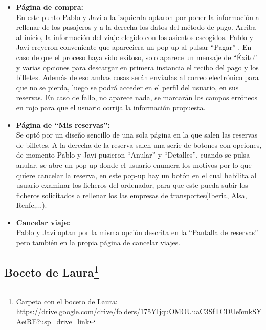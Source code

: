 \begin{itemize}
      \item\textbf{Página de compra:} \\ En este punto Pablo y Javi a la izquierda optaron por poner la información a rellenar de los pasajeros y a la derecha los datos del método de pago. Arriba al inicio, la información del viaje elegido con los asientos escogidos. Pablo y Javi creyeron conveniente que apareciera un pop-up al pulsar ``Pagar'' . En caso de que el proceso haya sido exitoso, solo aparece un mensaje de ``Éxito'' y varias opciones para descargar en primera instancia el recibo del pago y los billetes. Además de eso ambas cosas serán enviadas al correo electrónico para que no se pierda, luego se podrá acceder en el perfil del usuario, en sus reservas. En caso de fallo, no aparece nada, se marcarán los campos erróneos en rojo para que el usuario corrija la información propuesta.
      \item\textbf{Página de ``Mis reservas'':} \\ Se optó por un diseño sencillo de una sola página en la que salen las reservas de billetes. A la derecha de la reserva salen una serie de botones con opciones, de momento Pablo y Javi pusieron ``Anular'' y ``Detalles'', cuando se pulsa anular, se abre un pop-up donde el usuario enumera los motivos por lo que quiere cancelar la reserva, en este pop-up hay un botón en el cual habilita al usuario examinar los ficheros del ordenador, para que este pueda subir los ficheros solicitados a rellenar los las empresas de transportes(Iberia, Alsa, Renfe,...).

      \item\textbf{Cancelar viaje:} \\ Pablo y Javi optan por la misma opción descrita en la “Pantalla de reservas” pero también en la propia página de cancelar viajes.
\end{itemize}

\subsection[Boceto de Laura]{Boceto de Laura\footnote{Carpeta con el boceto de Laura: \url{https://drive.google.com/drive/folders/175YIjquOMOUuaC3SfTCDUe5mkSYAeiRE?usp=drive_link}}}

